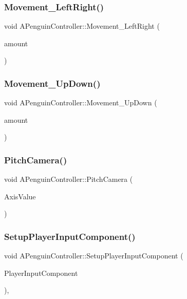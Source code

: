 \mbox{\label{class_a_penguin_controller_a4788c1ac82ad6ba574d2fd3bb5ee6f31}} 
\subsubsection{Movement\_LeftRight()}
{\footnotesize\ttfamily void A\+Penguin\+Controller\+::\+Movement\+\_\+\+Left\+Right (\begin{DoxyParamCaption}\item[{float}]{amount }\end{DoxyParamCaption})}

\mbox{\label{class_a_penguin_controller_a39cf1cd452a842a3241a53d053934544}} 
\subsubsection{Movement\_UpDown()}
{\footnotesize\ttfamily void A\+Penguin\+Controller\+::\+Movement\+\_\+\+Up\+Down (\begin{DoxyParamCaption}\item[{float}]{amount }\end{DoxyParamCaption})}

\mbox{\label{class_a_penguin_controller_a473b0f8a34d61b6741d1af6a9d76feef}} 
\subsubsection{PitchCamera()}
{\footnotesize\ttfamily void A\+Penguin\+Controller\+::\+Pitch\+Camera (\begin{DoxyParamCaption}\item[{float}]{Axis\+Value }\end{DoxyParamCaption})}

\mbox{\label{class_a_penguin_controller_a5d0ea623d8cae41f21ebd27f4e99fb70}} 
\subsubsection{SetupPlayerInputComponent()}
{\footnotesize\ttfamily void A\+Penguin\+Controller\+::\+Setup\+Player\+Input\+Component (\begin{DoxyParamCaption}\item[{class U\+Input\+Component $\ast$}]{Player\+Input\+Component }\end{DoxyParamCaption})\hspace{0.3cm}{\ttfamily [override]}, {\ttfamily [virtual]}}

